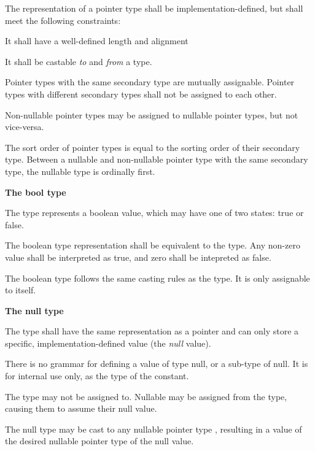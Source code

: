 \specsubsubitem
The representation of a pointer type shall be implementation-defined, but shall
meet the following constraints:

\begin{subsubitemize}
\item It shall have a well-defined length and alignment
\item It shall be castable \textit{to} and \textit{from} a  type.
\end{subsubitemize}

\specsubsubitem
Pointer types with the same secondary type are mutually assignable. Pointer
types with different secondary types shall not be assigned to each other.

\specsubsubitem
Non-nullable pointer types may be assigned to nullable pointer types, but not
vice-versa.

\specsubsubitem
The sort order of pointer types is equal to the sorting order of their secondary
type. Between a nullable and non-nullable pointer type with the same secondary
type, the nullable type is ordinally first.


\textbf{The bool type}

\specsubsubitem
The  type represents a boolean value, which may have one of two
states: true or false.

\specsubsubitem
The boolean type representation shall be equivalent to the  type.
Any non-zero value shall be interpreted as true, and zero shall be intepreted as
false.

\specsubsubitem
The boolean type follows the same casting rules as the  type. It
is only assignable to itself.

\textbf{The null type}

\specsubsubitem
The  type shall have the same representation as a pointer and can
only store a specific, implementation-defined value (the \textit{null} value).

\specsubsubitem
There is no grammar for defining a value of type null, or a sub-type of null. It
is for internal use only, as the type of the  constant.

\specsubsubitem
The  type may not be assigned to. Nullable  may be assigned from the  type, causing them to assume
their null value.

\specsubsubitem
The null type may be cast to any nullable pointer type , resulting in a value of the desired nullable pointer type of the null
value.

